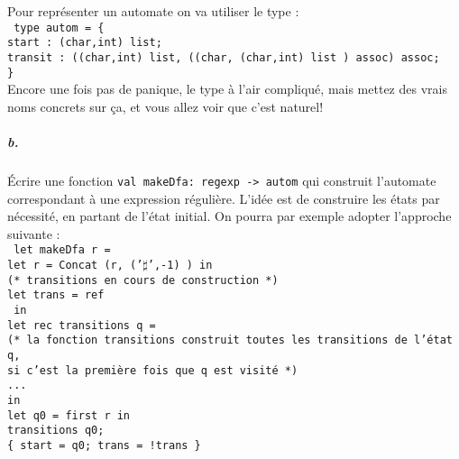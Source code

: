 \documentclass[10pt,a4paper]{article}
\begin{document}
 Pour représenter un automate on va utiliser le type :
\\\texttt{
type autom = \{ \\
start : (char,int) list;\\
transit : ((char,int) list, ((char, (char,int) list ) assoc)  assoc;\\
\}
}\\
Encore une fois pas de panique, le type à l'air compliqué, mais mettez des vrais
noms concrets sur ça, et vous allez voir que c'est naturel!
\\
\subparagraph{b.}
Écrire une fonction \texttt{val makeDfa: regexp -> autom} qui construit
l'automate correspondant à une expression régulière. L'idée est de construire
les états par nécessité, en partant de l'état initial. On pourra par exemple
adopter l'approche suivante :
\\
\texttt{
let makeDfa r = \\
  let r = Concat (r, ('$\sharp$',-1) ) in\\
  (* transitions en cours de construction *)\\
  let trans = ref \[ \] in\\
  let rec transitions q =\\
    (* la fonction transitions construit toutes les transitions de l'état q,\\
       si c'est la première fois que q est visité *)\\
    ...\\
  in\\
  let q0 = first r in\\
  transitions q0;\\
  \{ start = q0; trans = !trans \}\\
}
\end{document}
